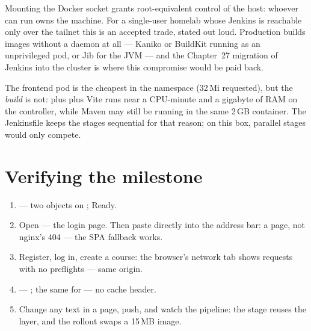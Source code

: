 \begin{decision}
Mounting the Docker socket grants root-equivalent control of the host:
whoever can run  owns the machine. For a
single-user homelab whose Jenkins is reachable only over the tailnet
this is an accepted trade, stated out loud. Production builds images
without a daemon at all --- Kaniko or BuildKit running as an
unprivileged pod, or Jib for the JVM --- and the Chapter~27 migration
of Jenkins into the cluster is where this compromise would be paid
back.
\end{decision}

\begin{hardware}
The frontend pod is the cheapest in the namespace (32\,Mi requested),
but the \emph{build} is not:  plus  plus Vite
runs near a CPU-minute and a gigabyte of RAM on the controller, while
Maven may still be running in the same 2\,GB container. The Jenkinsfile
keeps the stages sequential for that reason; on this box, parallel
stages would only compete.
\end{hardware}

\section{Verifying the milestone}

\begin{handson}
\begin{enumerate}
  \item {} --- two objects on
  ;  Ready.
  \item Open  --- the login page. Then paste
   directly into the address bar: a page,
  not nginx's 404 --- the SPA fallback works.
  \item Register, log in, create a course: the browser's network tab
  shows  requests with no  preflights ---
  same origin.
  \item {} --- ; the same for \code{/} --- no
  cache header.
  \item Change any text in a page, push, and watch the pipeline: the
   stage reuses the  layer, and the
  rollout swaps a 15\,MB image.
\end{enumerate}
\end{handson}

